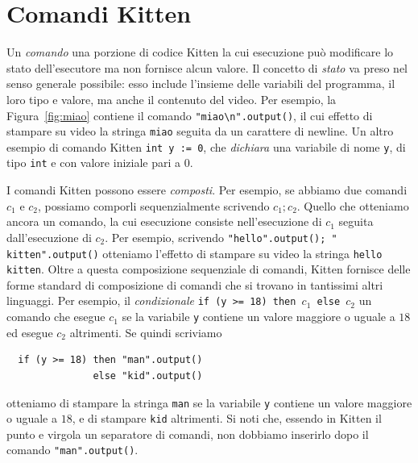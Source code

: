 \section{Comandi Kitten}\label{sec:commands}
%
Un \emph{comando} \e una porzione di codice Kitten la cui esecuzione
pu\`o modificare lo stato dell'esecutore ma non fornisce alcun valore.
Il concetto di \emph{stato} va preso nel senso \piu
generale possibile: esso include l'insieme delle variabili del programma,
il loro tipo e valore, ma anche il contenuto del video.
Per esempio, la Figura~\ref{fig:miao} contiene il
comando \verb|"miao\n".output()|, il cui effetto \e di stampare su video
la stringa \texttt{miao} seguita da un carattere di newline.
Un altro esempio di comando Kitten \e \verb|int y := 0|, che \emph{dichiara}
una variabile di nome \texttt{y}, di tipo \texttt{int} e con valore iniziale
pari a $0$.

I comandi Kitten
possono essere \emph{composti}. Per esempio, se abbiamo due comandi
$c_1$ e $c_2$, possiamo comporli sequenzialmente
scrivendo $c_1;c_2$. Quello che otteniamo
\e ancora un comando, la cui esecuzione consiste nell'esecuzione di $c_1$
seguita dall'esecuzione di $c_2$. Per esempio, scrivendo
\verb|"hello".output(); " kitten".output()| otteniamo l'effetto di
stampare su video la stringa \texttt{hello kitten}. Oltre a questa
composizione sequenziale di comandi, Kitten fornisce delle forme
standard di composizione di comandi che si trovano in tantissimi altri
linguaggi. Per esempio, il \emph{condizionale}
\texttt{if (y >= 18) then }$c_1$\texttt{ else }$c_2$
\e un comando che esegue $c_1$ se la variabile \texttt{y} contiene un valore
maggiore o uguale a $18$ ed esegue $c_2$ altrimenti. Se quindi scriviamo
%
\begin{verbatim}
  if (y >= 18) then "man".output()
               else "kid".output()
\end{verbatim}
%
otteniamo di stampare la stringa \texttt{man} se la variabile \texttt{y}
contiene un valore maggiore o uguale a $18$, e di stampare
\texttt{kid} altrimenti.
Si noti che, essendo in Kitten il punto e virgola un separatore di comandi,
non dobbiamo inserirlo dopo il comando \verb|"man".output()|.

